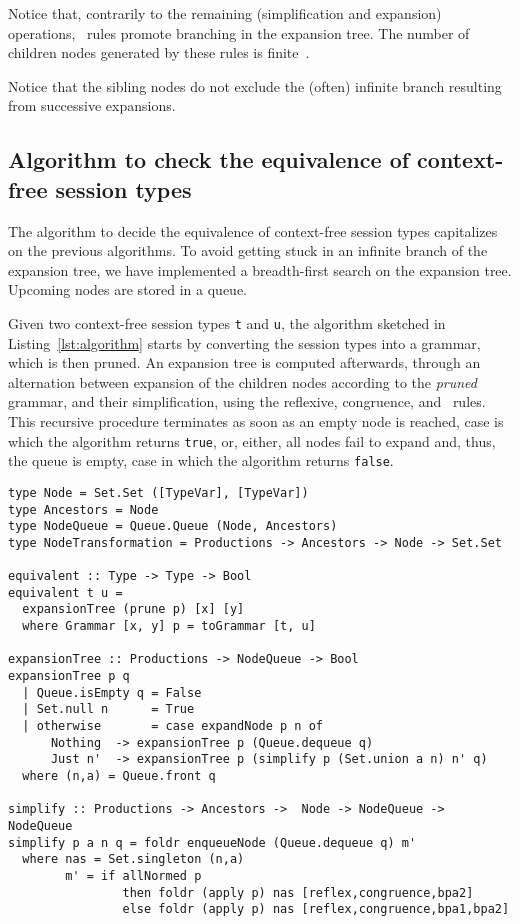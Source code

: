 Notice that, contrarily to the remaining (simplification and expansion) operations,
\BPA\ rules promote branching in the expansion tree. The number of children nodes
generated by these rules is finite~\cite{DBLP:journals/iandc/ChristensenHS95}.

Notice that the sibling nodes do not exclude the (often) infinite branch
resulting from successive expansions.

\subsection{Algorithm to check the equivalence of context-free session types}

The algorithm to decide the equivalence of context-free session
types capitalizes on the previous algorithms. To avoid getting stuck in an
infinite branch of the expansion tree, we have implemented
a breadth-first search on the expansion tree. Upcoming nodes are stored
in a queue.

Given two context-free session types \lstinline|t| and \lstinline|u|,
the algorithm sketched in Listing~\ref{lst:algorithm} starts by converting
the session types into a grammar, which is then pruned. An expansion tree is
computed afterwards, through an alternation between expansion of the children
nodes according to the \emph{pruned} grammar, and their simplification,
using the reflexive, congruence, and \BPA\ rules. This recursive procedure
terminates as soon as an empty node is reached, case is which the
algorithm returns \lstinline|true|, or, either, all nodes fail to expand
and, thus, the queue is empty, case in which the algorithm returns
\lstinline|false|.

\begin{lstlisting}[caption={Algorithm to check the equivalence of context-free session types. Haskell code.},label={lst:algorithm},captionpos=b]
type Node = Set.Set ([TypeVar], [TypeVar])
type Ancestors = Node
type NodeQueue = Queue.Queue (Node, Ancestors)
type NodeTransformation = Productions -> Ancestors -> Node -> Set.Set

equivalent :: Type -> Type -> Bool
equivalent t u =
  expansionTree (prune p) [x] [y]
  where Grammar [x, y] p = toGrammar [t, u]

expansionTree :: Productions -> NodeQueue -> Bool
expansionTree p q
  | Queue.isEmpty q = False
  | Set.null n      = True
  | otherwise       = case expandNode p n of
      Nothing  -> expansionTree p (Queue.dequeue q)
      Just n'  -> expansionTree p (simplify p (Set.union a n) n' q)
  where (n,a) = Queue.front q

simplify :: Productions -> Ancestors ->  Node -> NodeQueue -> NodeQueue
simplify p a n q = foldr enqueueNode (Queue.dequeue q) m'
  where nas = Set.singleton (n,a)
        m' = if allNormed p
                then foldr (apply p) nas [reflex,congruence,bpa2]
                else foldr (apply p) nas [reflex,congruence,bpa1,bpa2]
\end{lstlisting}

